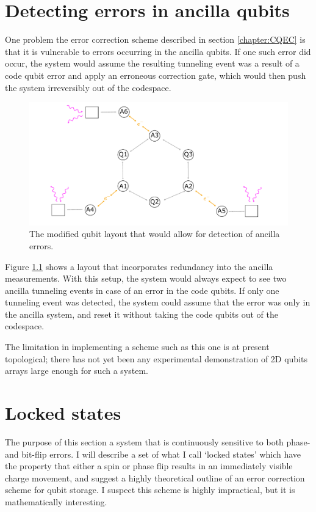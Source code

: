 \documentclass{report}
\begin{document}
\begin{appendices}
\chapter{Detecting errors in ancilla qubits} \label{appendix:9qubitsystem}
One problem the error correction scheme described in section \ref{chapter:CQEC} is that it is vulnerable to errors occurring in the ancilla qubits. If one such error did occur, the system would assume the resulting tunneling event was a result of a code qubit error and apply an erroneous correction gate, which would then push the system irreversibly out of the codespace.
\begin{figure}[ht]
    \centering
    \includegraphics[scale = 0.9]{Figures/9q.pdf}
    \caption{The modified qubit layout that would allow for detection of ancilla errors.}
    \label{fig:9qubitlayout}
\end{figure}
Figure \ref{fig:9qubitlayout} shows a layout that incorporates redundancy into the ancilla measurements. With this setup, the system would always expect to see two ancilla tunneling events in case of an error in the code qubits. If only one tunneling event was detected, the system could assume that the error was only in the ancilla system, and reset it without taking the code qubits out of the codespace.

The limitation in implementing a scheme such as this one is at present topological; there has not yet been any experimental demonstration of 2D qubits arrays large enough for such a system.
\chapter{Locked states} \label{appendix:lockedstates}
The purpose of this section a system that is continuously sensitive to both phase- and bit-flip errors. I will describe a set of what I call `locked states' which have the property that either a spin or phase flip results in an immediately visible charge movement, and suggest a highly theoretical outline of an error correction scheme for qubit storage. I suspect this scheme is highly impractical, but it is mathematically interesting.


\end{appendices}
\end{document}
